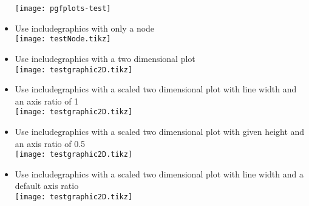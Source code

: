 \documentclass[twocolumn]{article}
\begin{document}
\begin{itemize}
			\texttt{[image: pgfplots-test]}%
		\item Use includegraphics with only a node\\%
			\texttt{[image: testNode.tikz]}%
		\item Use includegraphics with a two dimensional plot\\%
			\texttt{[image: testgraphic2D.tikz]}%
		\item Use includegraphics with a scaled two dimensional plot with line width and an axis ratio of 1\\%
			\texttt{[image: testgraphic2D.tikz]}%
		\item Use includegraphics with a scaled two dimensional plot with given height and an axis ratio of 0.5\\%
			\texttt{[image: testgraphic2D.tikz]}%
		\item Use includegraphics with a scaled two dimensional plot with line width and a default axis ratio\\%
			\texttt{[image: testgraphic2D.tikz]}%
	\end{itemize}
\end{document}
